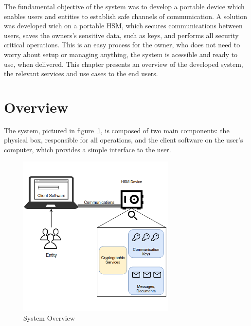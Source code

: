 \cleardoublepage
\label{chap:arch}

The fundamental objective of the system was to develop a portable device which enables users and entities to establish safe channels of communication.
A solution was developed wich on a portable \ac{HSM}, which secures communications between users, saves the owners's sensitive data, such as keys, and performs all security critical operations. This is an easy process for the owner, who does not need to worry about setup or managing anything, the system is acessible and ready to use, when delivered.
This chapter presents an overview of the developed system, the relevant services and use cases to the end users.


\section{Overview}\label{chap:arch:overview}

The system, pictured in figure~\ref{fig:overview}, is composed of two main components: the physical box, responsible for all operations, and the client software on the user's computer, which provides a simple interface to the user.

\begin{figure}[h]
    \centering
    \includegraphics[width=0.7\textwidth]{./Images/overview.png}
    \caption{System Overview}
    \label{fig:overview}
\end{figure}

